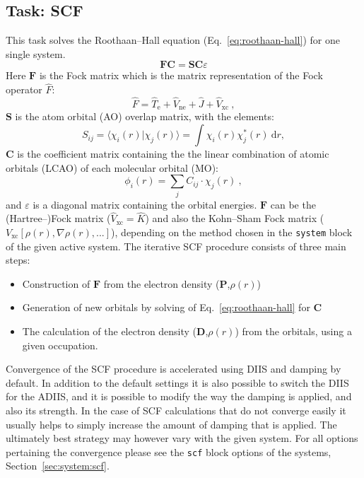 \documentclass[bibliography=totocnumbered,a4paper,10pt,oneside]{scrbook}
\newcommand{\ttt}[1]{%
  \begingroup\setlength{\fboxsep}{1pt}%
  \colorbox{serenity-green!30}{\texttt{\hspace*{2pt}\vphantom{(g}#1\hspace*{2pt}}}%
  \endgroup
}
\begin{document}
\subsection{Task: SCF}
This task solves the Roothaan--Hall equation (Eq.~\ref{eq:roothaan-hall}) for one single system.
\begin{equation}\label{eq:roothaan-hall}
\textbf{F}\textbf{C} =  \textbf{S}\textbf{C}\varepsilon
\end{equation}
Here $\textbf{F}$ is the Fock matrix which is the matrix representation of the Fock operator $\hat{F}$:
\begin{equation}\label{eq:fockop}
\hat{F} = \hat{T}_{\text{e}} + \hat{V}_{\text{ne}} + \hat{J} + \hat{V}_{\text{xc}}~,
\end{equation}
$\textbf{S}$ is the atom orbital (AO) overlap matrix, with the elements:
\begin{equation}
S_{ij} = \langle \chi_i(r) | \chi_j(r) \rangle= \int \chi_i(r) \chi^*_j(r) ~\text{d}r,
\end{equation}
$\textbf{C}$ is the coefficient matrix containing the the linear combination of atomic orbitals (LCAO) of
each molecular orbital (MO):
\begin{equation}
\phi_i(r) = \sum_j C_{ij} \cdot \chi_j(r)~,
\end{equation}
and $\varepsilon$ is a diagonal matrix containing the orbital energies.
$\textbf{F}$ can be the (Hartree--)Fock matrix ($\hat{V}_{\text{xc}} = \hat{K}$) and also the Kohn--Sham Fock matrix ($V_{\text{xc}}[\rho(r),\nabla\rho(r),...]$), depending on the method chosen
in the \ttt{system} block of the given active system.
The iterative SCF procedure consists of three main steps:
\begin{itemize}
	\item Construction of $\textbf{F}$ from the electron density ($\textbf{P}$,$\rho(r)$)
	\item Generation of new orbitals by solving of Eq.~\ref{eq:roothaan-hall} for $\textbf{C}$
	\item The calculation of the electron density ($\textbf{D}$,$\rho(r)$) from the orbitals, using a given occupation.
\end{itemize}
Convergence of the SCF procedure is accelerated using DIIS\cite{pula1982} and damping by default.
In addition to the default settings it is also possible to switch the DIIS\cite{pula1982} for the ADIIS\cite{hu2010},
and it is possible to modify the way the damping is applied, and also its strength.
In the case of SCF calculations that do not converge easily it usually helps to simply increase the amount of damping that is
applied.
The ultimately best strategy may however vary with the given system.
For all options pertaining the convergence please see the \ttt{scf} block options of the systems, Section~\ref{sec:system:scf}.
\end{document}
